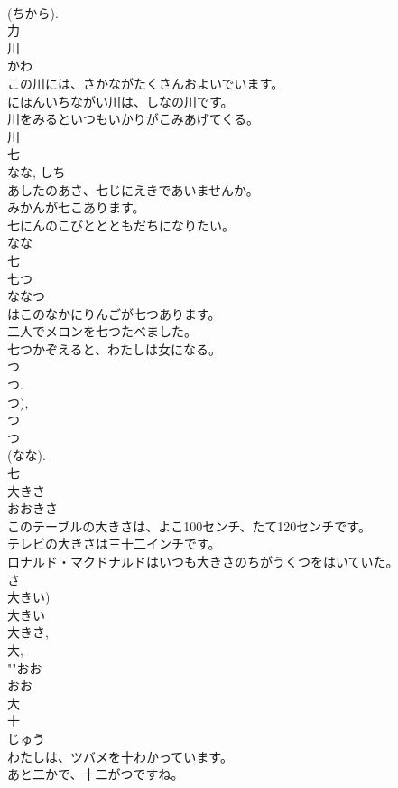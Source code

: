 \documentclass[8pt]{extreport}
\begin{document}
\begin{CJK}{UTF8}{min}
\\	(ちから). 
\\	力	
\\	川	
\\	かわ	
\\	この川には、さかながたくさんおよいでいます。	
\\	にほんいちながい川は、しなの川です。	
\\	川をみるといつもいかりがこみあげてくる。	
\\	川	
\\	七	
\\	なな, しち	
\\	あしたのあさ、七じにえきであいませんか。	
\\	みかんが七こあります。	
\\	七にんのこびととともだちになりたい。	
\\	なな 
\\	七	
\\	七つ	
\\	ななつ	
\\	はこのなかにりんごが七つあります。	
\\	二人でメロンを七つたべました。	
\\	七つかぞえると、わたしは女になる。	
\\	つ 
\\	つ. 
\\	つ), 
\\	つ 
\\	つ 
\\	(なな). 
\\	七	
\\	大きさ	
\\	おおきさ	
\\	このテーブルの大きさは、よこ100センチ、たて120センチです。	
\\	テレビの大きさは三十二インチです。	
\\	ロナルド・マクドナルドはいつも大きさのちがうくつをはいていた。	
\\	さ 
\\	大きい) 
\\	大きい 
\\	大きさ, 
\\	大, 
\\	""おお 
\\	おお 
\\	大	
\\	十	
\\	じゅう	
\\	わたしは、ツバメを十わかっています。	
\\	あと二かで、十二がつですね。	

\end{CJK}
\end{document}
